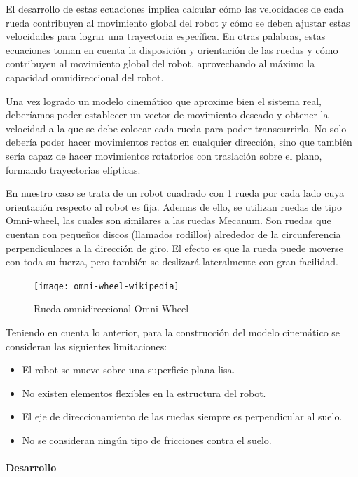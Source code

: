 El desarrollo de estas ecuaciones implica calcular cómo las velocidades de cada rueda contribuyen al movimiento global del robot y cómo se deben ajustar estas velocidades para lograr una trayectoria específica. En otras palabras, estas ecuaciones toman en cuenta la disposición y orientación de las ruedas y cómo contribuyen al movimiento global del robot, aprovechando al máximo la capacidad omnidireccional del robot.

Una vez logrado un modelo cinemático que aproxime bien el sistema real, deberíamos poder establecer un vector de movimiento deseado y obtener la velocidad a la que se debe colocar cada rueda para poder transcurrirlo. No solo debería poder hacer movimientos rectos en cualquier dirección, sino que también sería capaz de hacer movimientos rotatorios con traslación sobre el plano, formando trayectorias elípticas. \cite{rijalusalamkinematics}

En nuestro caso se trata de un robot cuadrado con 1 rueda por cada lado cuya orientación respecto al robot es fija. Ademas de ello, se utilizan ruedas de tipo Omni-wheel, las cuales son similares a las ruedas Mecanum. Son ruedas que cuentan con pequeños discos (llamados rodillos) alrededor de la circunferencia perpendiculares a la dirección de giro. El efecto es que la rueda puede moverse con toda su fuerza, pero también se deslizará lateralmente con gran facilidad.

\begin{figure}[H]
    \centering
    \texttt{[image: omni-wheel-wikipedia]}
    \caption{Rueda omnidireccional Omni-Wheel}
    \label{fig:ruedaomniwheel}
\end{figure}

Teniendo en cuenta lo anterior, para la construcción del modelo cinemático se consideran las siguientes limitaciones:

\begin{itemize}
    \item El robot se mueve sobre una superficie plana lisa.
    \item No existen elementos flexibles en la estructura del robot.
    \item El eje de direccionamiento de las ruedas siempre es perpendicular al suelo.
    \item No se consideran ningún tipo de fricciones contra el suelo.
\end{itemize}

\paragraph{Desarrollo} \mbox{} \vspace{8pt}

